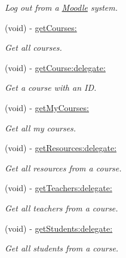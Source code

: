 \begin{DoxyCompactItemize}
\begin{DoxyCompactList}\small\item\em Log out from a \hyperlink{interface_moodle}{Moodle} system. \item\end{DoxyCompactList}\item 
(void) -\/ \hyperlink{interface_moodle_af557618a5c74a5b786311459499ea850}{getCourses:}
\begin{DoxyCompactList}\small\item\em Get all courses. \item\end{DoxyCompactList}\item 
(void) -\/ \hyperlink{interface_moodle_a305417edc7b5fd47e19d8e7d888af614}{getCourse:delegate:}
\begin{DoxyCompactList}\small\item\em Get a course with an ID. \item\end{DoxyCompactList}\item 
(void) -\/ \hyperlink{interface_moodle_a381adeb477225e16f6bb35288c7d8a2a}{getMyCourses:}
\begin{DoxyCompactList}\small\item\em Get all my courses. \item\end{DoxyCompactList}\item 
(void) -\/ \hyperlink{interface_moodle_a979d64f5269da915013a13ed7b7ccc08}{getResources:delegate:}
\begin{DoxyCompactList}\small\item\em Get all resources from a course. \item\end{DoxyCompactList}\item 
(void) -\/ \hyperlink{interface_moodle_acfceceac0230b35cec8bf956529978f2}{getTeachers:delegate:}
\begin{DoxyCompactList}\small\item\em Get all teachers from a course. \item\end{DoxyCompactList}\item 
(void) -\/ \hyperlink{interface_moodle_a5e8d12f26f66b20f27021cddbca69e4d}{getStudents:delegate:}
\begin{DoxyCompactList}\small\item\em Get all students from a course. \item\end{DoxyCompactList}\item 

\end{DoxyCompactItemize}
